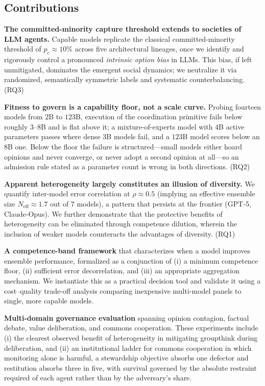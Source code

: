 \documentclass[manuscript,screen,review]{acmart}
\newcommand{\rev}[1]{\textcolor{revblue}{#1}}
\begin{document}
\subsection{Contributions}
\begin{enumerate}
\item \textbf{The committed-minority capture threshold extends to societies of LLM agents.} Capable models replicate the classical committed-minority threshold of $p_c \approx 10\%$ across five architectural lineages, once we identify and rigorously control a pronounced \emph{intrinsic option bias} in LLMs. This bias, if left unmitigated, dominates the emergent social dynamics; we neutralize it via randomized, semantically symmetric labels and systematic counterbalancing. (RQ3)

\rev{\item \textbf{Fitness to govern is a capability floor, not a scale curve.} Probing fourteen models from $2$B to $123$B, execution of the coordination primitive fails below roughly $3$--$8$B and is flat above it; a mixture-of-experts model with $4$B active parameters passes where dense $3$B models fail, and a $123$B model scores below an $8$B one. Below the floor the failure is structured---small models either hoard opinions and never converge, or never adopt a second opinion at all---so an admission rule stated as a parameter count is wrong in both directions. (RQ2)}

\item \textbf{Apparent heterogeneity largely constitutes an illusion of diversity.} We quantify inter-model error correlation at $\rho \approx 0.5$ (implying an effective ensemble size $N_{\mathrm{eff}} \approx 1.7$ out of $7$ models), a pattern that persists at the frontier (GPT-5, Claude-Opus). We further demonstrate that the protective benefits of heterogeneity can be eliminated through competence dilution, wherein the inclusion of weaker models counteracts the advantages of diversity. (RQ1)

\item \textbf{A competence-band framework} that characterizes when a model improves ensemble performance, formalized as a conjunction of (i) a minimum competence floor, (ii) sufficient error decorrelation, and (iii) an appropriate aggregation mechanism. We instantiate this as a practical decision tool and validate it using a cost–quality trade-off analysis comparing inexpensive multi-model panels to single, more capable models.

\item \textbf{Multi-domain governance evaluation} spanning opinion contagion, factual debate, value deliberation, and commons cooperation. These experiments include (i) the clearest observed benefit of heterogeneity in mitigating groupthink during deliberation, \rev{and (ii) an institutional ladder for commons cooperation in which monitoring alone is harmful, a stewardship objective absorbs one defector and restitution absorbs three in five, with survival governed by the absolute restraint required of each agent rather than by the adversary's share.}


\end{enumerate}
\end{document}
